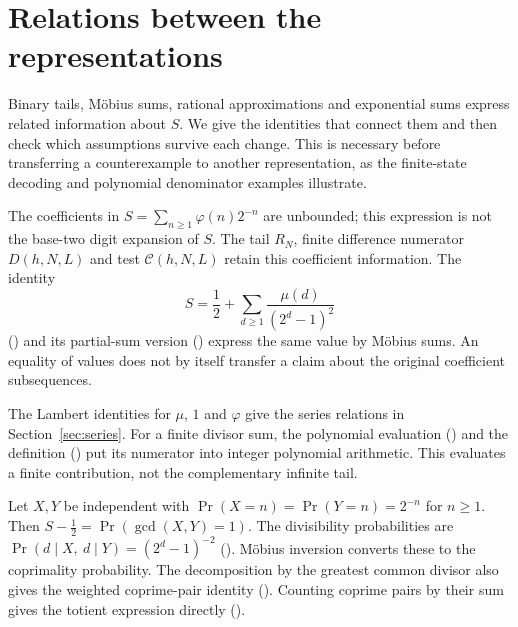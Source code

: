 \section{Relations between the representations}

Binary tails, M\"obius sums, rational approximations and exponential
sums express related information about $S$. We give the identities
that connect them and then check which assumptions survive each
change. This is necessary before transferring a counterexample to
another representation, as the finite-state decoding and polynomial
denominator examples illustrate.

\begin{description}[leftmargin=*,style=nextline]

\item[Binary-weighted series and tails.]
The coefficients in $S=\sum_{n\ge1}\varphi(n)2^{-n}$ are unbounded;
this expression is not the base-two digit expansion of $S$.
The tail $R_N$, finite difference numerator $D(h,N,L)$ and test
$\mathcal C(h,N,L)$ retain this coefficient information. The identity
\[
 S=\frac12+\sum_{d\ge1}\frac{\mu(d)}{(2^d-1)^2}
\]
()
and its partial-sum version
()
express the same value by M\"obius sums. An equality of values does not
by itself transfer a claim about the original coefficient subsequences.

\item[Lambert sums and finite numerator polynomials.]
The Lambert identities for $\mu$, $1$ and $\varphi$ give the series
relations in Section~\ref{sec:series}. For a finite divisor sum, the
polynomial evaluation
()
and the definition
()
put its numerator into integer polynomial arithmetic. This evaluates a
finite contribution, not the complementary infinite tail.

\item[Coprimality probability.]
Let $X,Y$ be independent with $\Pr(X=n)=\Pr(Y=n)=2^{-n}$ for $n\ge1$.
Then $S-\tfrac12=\Pr(\gcd(X,Y)=1)$. The divisibility probabilities are
$\Pr(d\mid X,\ d\mid Y)=(2^d-1)^{-2}$
().
M\"obius inversion converts these to the coprimality probability.
The decomposition by the greatest common divisor also gives the weighted
coprime-pair identity
().
Counting coprime pairs by their sum gives the totient expression directly
().


\end{description}
